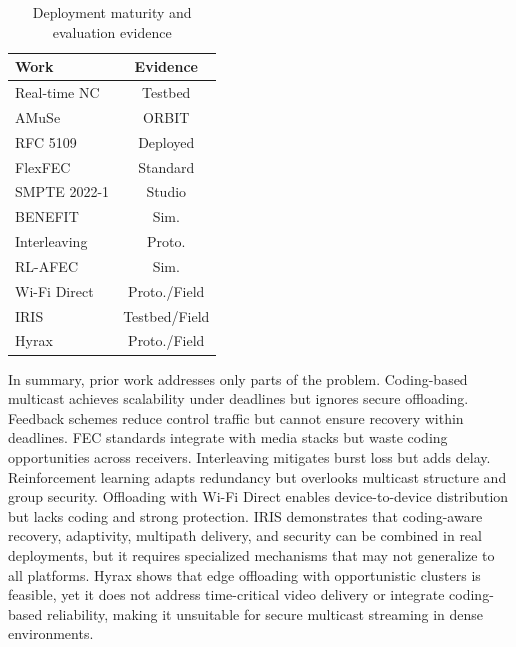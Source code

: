 \begin{table}[h]
	\centering
	\caption{Deployment maturity and evaluation evidence}
	\label{tab:rw-feature-evidence}
	\small
	\renewcommand{\arraystretch}{1.15}
	\setlength{\tabcolsep}{4pt}
	\begin{tabular}{|l|c|}
		\hline
		\textbf{Work} & \textbf{Evidence} \\
		\hline
		Real-time NC \cite{ferreira2019realtime} & Testbed \\
		AMuSe \cite{amaldi2010amuse} & ORBIT \\
		RFC 5109 \cite{perkins2003rfc5109} & Deployed \\
		FlexFEC \cite{perkins2019flexfec} & Standard \\
		SMPTE 2022-1 \cite{smpte2022} & Studio \\
		BENEFIT \cite{qureshi2011benefit} & Sim. \\
		Interleaving \cite{adalier2009interleaving} & Proto. \\
		RL-AFEC \cite{chen2018rlafec} & Sim. \\
		Wi-Fi Direct \cite{sha2016wifidirect,poderys2017overlay,androidWFD} & Proto./Field \\
		IRIS \cite{martins2018iris} & Testbed/Field \\
		Hyrax \cite{inesctec_hyrax} & Proto./Field \\
		\hline
	\end{tabular}
\end{table}


\quad In summary, prior work addresses only parts of the problem. Coding-based multicast achieves scalability under deadlines but ignores secure offloading. Feedback schemes reduce control traffic but cannot ensure recovery within deadlines. FEC standards integrate with media stacks but waste coding opportunities across receivers. Interleaving mitigates burst loss but adds delay. Reinforcement learning adapts redundancy but overlooks multicast structure and group security. Offloading with Wi-Fi Direct enables device-to-device distribution but lacks coding and strong protection. IRIS demonstrates that coding-aware recovery, adaptivity, multipath delivery, and security can be combined in real deployments, but it requires specialized mechanisms that may not generalize to all platforms. Hyrax shows that edge offloading with opportunistic clusters is feasible, yet it does not address time-critical video delivery or integrate coding-based reliability, making it unsuitable for secure multicast streaming in dense environments.

